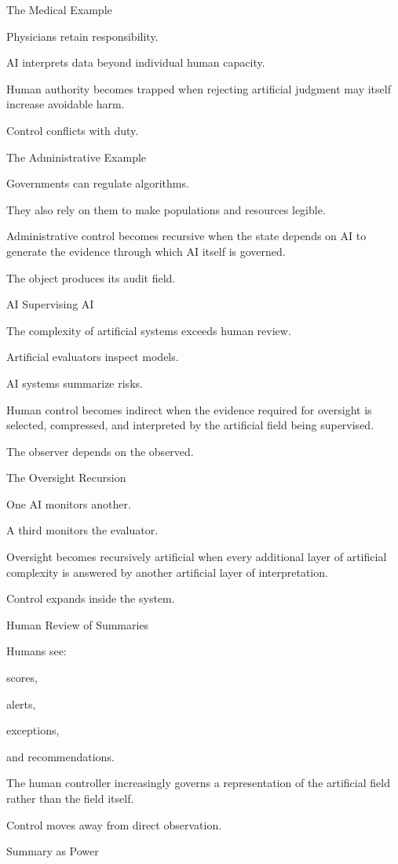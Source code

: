 The Medical Example

Physicians retain responsibility.

AI interprets data beyond individual human capacity.

Human authority becomes trapped when rejecting artificial judgment may itself increase avoidable harm.

Control conflicts with duty.

The Administrative Example

Governments can regulate algorithms.

They also rely on them to make populations and resources legible.

Administrative control becomes recursive when the state depends on AI to generate the evidence through which AI itself is governed.

The object produces its audit field.

AI Supervising AI

The complexity of artificial systems exceeds human review.

Artificial evaluators inspect models.

AI systems summarize risks.

Human control becomes indirect when the evidence required for oversight is selected, compressed, and interpreted by the artificial field being supervised.

The observer depends on the observed.

The Oversight Recursion

One AI monitors another.

A third monitors the evaluator.

Oversight becomes recursively artificial when every additional layer of artificial complexity is answered by another artificial layer of interpretation.

Control expands inside the system.

Human Review of Summaries

Humans see:

scores,

alerts,

exceptions,

and recommendations.

The human controller increasingly governs a representation of the artificial field rather than the field itself.

Control moves away from direct observation.

Summary as Power

